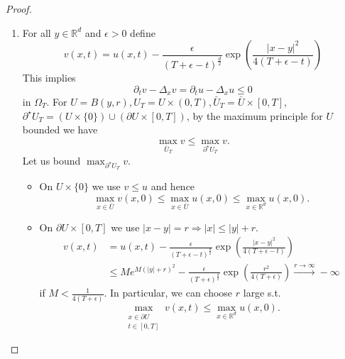 \documentclass{report}
\theoremstyle{tommy}
\begin{document}
  \begin{proof}\
    \begin{enumerate}[label=Step \arabic*:]
      \item For all \(y \in \mathbb{R}^d\) and \(\epsilon > 0\) define 
      \[v(x,t) = u(x,t) - \frac{\epsilon}{(T+\epsilon-t)^{\frac{d}{2}}} \exp \left(\frac{|x-y|^2}{4(T+\epsilon-t)}\right)\]
      This implies 
      \[\partial_t v - \Delta_x v = \partial_t u - \Delta_x u \le 0\] in \(\Omega_T\). For \(U = B(y,r), U_T = U \times (0,T), \bar U_T = \bar U \times [0,T]\), \(
        \partial^\star U_T = (U \times \{0\}) \cup (\partial U \times [0,T])\), by the maximum principle for \(U\) bounded we have 
        \[\max_{\bar U_T} v \le \max_{\partial^\star U_T} v.\]
        Let us bound \(\max_{\partial^\star U_T} v\).
        \begin{itemize}
          \item On \(U \times \{0\}\) we use \(v \le u\) and hence 
          \[\max_{x \in \bar U} v(x,0) \le \max_{x \in \bar U} u(x,0) \le \max_{x \in \mathbb{R}^d} u(x,0).\]
          \item On \(\partial U \times [0,T]\) we use \(|x-y|=r \Rightarrow |x| \le |y| + r\).
          \begin{align*}
            v(x,t) &= u(x,t) - \frac{\epsilon}{(T+\epsilon-t)^{\frac{d}{2}}} \exp \left(\frac{|x-y|^2}{4(T+\epsilon-t)}\right) \\
            &\le Me^{M(|y|+r)^2}-\frac{\epsilon}{(T+\epsilon)^{\frac{d}{2}}} \exp \left(\frac{r^2}{4(T+\epsilon)}\right) \xrightarrow{r \to \infty} - \infty
          \end{align*}
          if  \(M < \frac{1}{4(T+\epsilon)}\). In particular, we can choose \(r\) large s.t.
          \[\max_{\substack{x \in \partial U\\t \in [0,T]}} v(x,t) \le \max_{x \in \mathbb{R}^d} u(x,0).\]
        \end{itemize}


\end{enumerate}
\end{proof}
\end{document}
